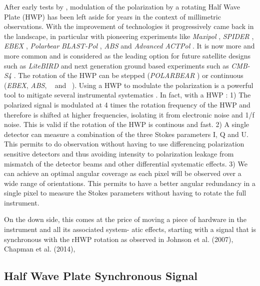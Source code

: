 After early tests by \citep{1984ApJ...284L..51H}, modulation of the polarization by a rotating Half Wave Plate (HWP) has been left aside for  years in the context of millimetric observations. With the improvement of technologies it progressively came back in the landscape, in particular with pioneering experiments like \emph{Maxipol} \citep{2007ApJ...665...42J}, \emph{SPIDER} \citep{2008SPIE.7010E..2PC}, \emph{EBEX} \citep{2010SPIE.7741E..1CR}, \emph{Polarbear} \citep{2012SPIE.8452E..1CK} \emph{BLAST-Pol} \citep{2014MNRAS.437.2772M}, \emph{ABS} \citep{2014RScI...85c9901K} and \emph{Advanced ACTPol} \citep{2016JLTP..184..772H}. It is now more and more common and is considered as the leading option for future satellite designs such as \emph{LiteBIRD} \citep{2014JLTP..176..733M} and next generation ground based experiments such as \emph{CMB-S4} \citep{2016arXiv161002743A}. The rotation of the HWP can be stepped (\emph{POLARBEAR} \citep{2014ApJ...794..171P}) or continuous  (\emph{EBEX}, \emph{ABS}, \nika\ \citep{2017A&A...599A..34R} and \nikad\  \citep{2015fers.confE..16R}).
Using a HWP to modulate the polarization is a powerful tool to mitigate several instrumental systematics \citep{2009MNRAS.397..634B}. In fact, with a HWP :
1) The polarized signal is modulated at 4 times the rotation frequency of the HWP and therefore is shifted at higher frequencies, isolating it from electronic noise and 1/f noise. This is valid if the rotation of the HWP is continous and fast.
2) A single detector can measure a combination of the three Stokes parameters I, Q and U. This permits to do observation without having to use differencing polarization sensitive detectors and thus avoiding intensity to polarization leakage from mismatch of the detector beams and other differential systematic effects.
3) We can achieve an optimal angular coverage as each pixel will be observed over a wide range of orientations. This permits to have a better angular redundancy in a single pixel to measure the Stokes parameters without having to rotate the full instrument.






  On the down side, this comes at the price of moving a piece of hardware in the instrument and all its associated system- atic effects, starting with a signal that is synchronous with the rHWP rotation as observed in Johnson et al. (2007), Chapman et al. (2014),

\subsection{Half Wave Plate Synchronous Signal}
